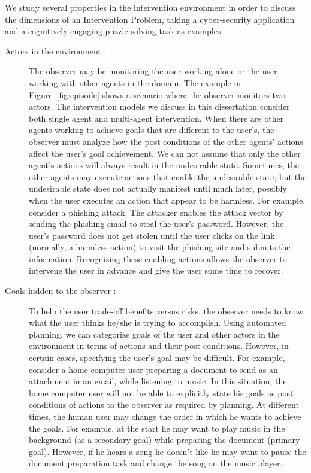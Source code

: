 We study several properties in the intervention environment in order to discuss the dimensions of an Intervention Problem, taking a cyber-security application and a cognitively engaging puzzle solving task as examples.
\begin{description}
\item [Actors in the environment :] The observer may be monitoring the user working alone or the user working with other agents in the domain. 
The example in Figure~\ref{fig:episode} shows a scenario where the observer monitors two actors. 
The intervention models we discuss in this dissertation consider both single agent and multi-agent intervention.
When there are other agents working to achieve goals that are different to the user's, the observer must  analyze how the post conditions of the other agents' actions affect the user's goal achievement. 
We can not assume that only the other agent's actions will always result in the undesirable state.
Sometimes, the other agents may execute actions that enable the undesirable state, but the undesirable state does not actually manifest until much later, possibly when the user executes an action that appear to be harmless. 
For example, consider a phishing attack. 
The attacker enables the attack vector by sending the phishing email to steal the user's password. However, the user's password does not get stolen until the user clicks on the link (normally, a  harmless action) to visit the phishing site and submits the information.
Recognizing these enabling actions allows the observer to intervene the user in advance and give the user some time to recover.
\item [Goals hidden to the observer :] To help the user trade-off benefits versus risks, the observer needs to know what the user thinks he/she is trying to accomplish.  
Using automated planning, we can categorize goals of the user and other actors in the environment in terms of  actions and their post conditions. 
However, in certain cases, specifying the user's goal may be difficult. 
For example, consider a home computer user preparing a document to send as an attachment in an email, while listening to music. 
In this situation, the home computer user will not be able to explicitly state his goals as post conditions of actions to the observer as required by planning.
At different times, the human user may change the order in which he wants to achieve the goals. 
For example, at the start he may want to play music in the background (as a secondary goal) while preparing the document (primary goal).
However, if he hears a song he doesn't like he may want to pause the document preparation task and change the song on the music player.

\end{description}
